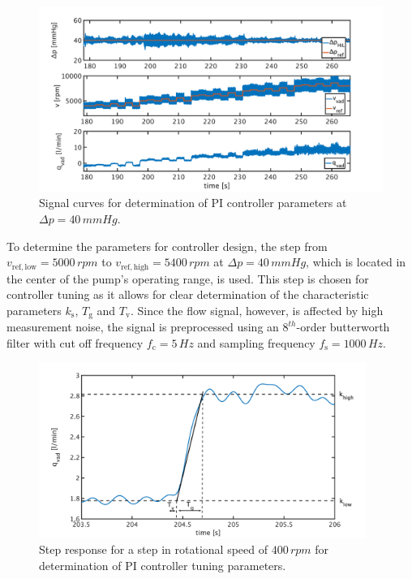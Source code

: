 \begin{figure}[ht]
  \centering
  \includegraphics[width=\textwidth]{images/chapt_5/dyn_meas_40.pdf}
  \caption[Signal curves for determination of PI controller parameters at $\Delta{p}=40\,mmHg$]{Signal curves for determination of PI controller parameters at $\Delta{p}=40\,mmHg$.}
  \label{fig:dyn_meas_40}
\end{figure}
To determine the parameters for controller design, the step from $v_{\mathrm{ref,low}}=5000\, rpm$ to $v_{\mathrm{ref,high}}=5400\, rpm$ at $\Delta{p}=40\,mmHg$, which is located in the center of the pump's operating range, is used. This step is chosen for controller tuning as it allows for clear determination of the characteristic parameters $k_{\mathrm{s}}$, $T_{\mathrm{g}}$ and $T_{\mathrm{v}}$.
Since the flow signal, however, is affected by high measurement noise, the signal is preprocessed using an $8^{th}$-order butterworth filter with cut off frequency $f_{\mathrm{c}}=5\,Hz$ and sampling frequency $f_{\mathrm{s}}=1000\,Hz$.
\begin{figure}[ht]
  \centering
  \includegraphics[width=0.95\textwidth]{images/chapt_5/param_calc_PI.pdf}
  \caption[Step response for determination of PI controller tuning parameters]{Step response for a step in rotational speed of $400\,rpm$ for determination of PI controller tuning parameters.}
  \label{fig:param_calc_PI}
\end{figure}
